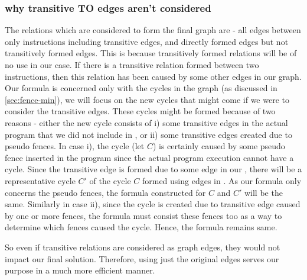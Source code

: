 \subsubsection{why transitive TO edges aren't considered} \label{sec:no-transitive}
The relations which are considered to form the final graph are - 
all \setSB edges between only \mosc instructions including transitive \setSB edges, 
and directly formed \setTO edges but not transitively formed \setTO edges.  
This is because transitively formed \setTO relations will be of 
no use in our case. If there is a transitive \setTO relation formed 
between two instructions, then this relation has been caused by 
some other edges in our graph. 
Our formula is concerned only with the cycles in the graph 
(as discussed in \textsection\ref{sec:fence-min}), we will focus on 
the new cycles that might come if we were to consider the transitive 
edges. These cycles might be formed because of two reasons - 
either the new cycle consists of i) some transitive edges in the 
actual program that we did not include in \setTO, or ii) some 
transitive edges created due to pseudo fences. In case i), the cycle 
(let $C$) is certainly caused by some pseudo fence inserted in the program 
since the actual program execution cannot have a cycle. Since the 
transitive edge is formed due to some edge in our \setTO, there 
will be a representative cycle $C'$ of the cycle $C$ formed using 
edges in \setTO. As our formula only concerns the pseudo fences, 
the formula constructed for $C$ and $C'$ will be the same. 
Similarly in case ii), since the cycle is created due to transitive 
edge caused by one or more fences, the formula must consist these 
fences too as a way to determine which fences caused the cycle. Hence,
the formula remains same. 




\par
So even if transitive \setTO relations are considered as graph edges, 
they would not impact our final solution. 
Therefore, using just the original edges serves our purpose 
in a much more efficient manner.